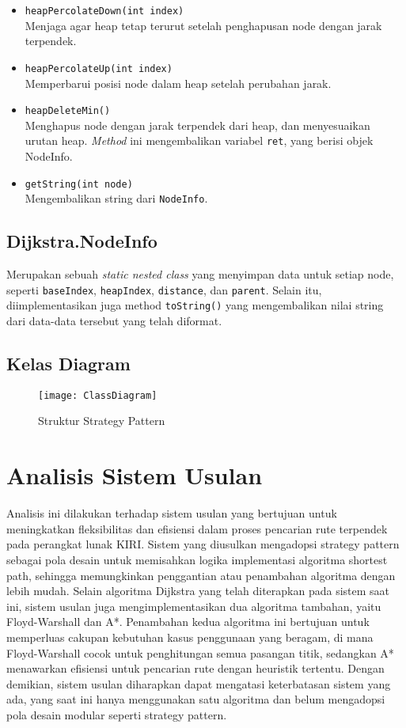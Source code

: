 \begin{itemize}
\begin{itemize}
        \item \texttt{heapPercolateDown(int index)}
        \\ Menjaga agar heap tetap terurut setelah penghapusan node dengan jarak terpendek.
        \item \texttt{heapPercolateUp(int index)}
        \\ Memperbarui posisi node dalam heap setelah perubahan jarak.
        \item \texttt{heapDeleteMin()}
        \\ Menghapus node dengan jarak terpendek dari heap, dan menyesuaikan urutan heap. \textit{Method} ini mengembalikan variabel \texttt{ret}, yang berisi objek NodeInfo.
        \item \texttt{getString(int node)}
        \\ Mengembalikan string dari \texttt{NodeInfo}.
    \end{itemize}
\end{itemize}

\subsection{Dijkstra.NodeInfo}
Merupakan sebuah \textit{static nested class} yang menyimpan data untuk setiap node, seperti \texttt{baseIndex}, \texttt{heapIndex}, \texttt{distance}, dan \texttt{parent}. Selain itu, diimplementasikan juga method \texttt{toString()} yang mengembalikan nilai string dari data-data tersebut yang telah diformat.

\subsection{Kelas Diagram}
\begin{figure}[h] 
    \centering  
    \texttt{[image: ClassDiagram]}  
    \caption{Struktur Strategy Pattern}
    \label{fig:struktursp2} 
\end{figure}
\newpage
\section{Analisis Sistem Usulan}
Analisis ini dilakukan terhadap sistem usulan yang bertujuan untuk meningkatkan fleksibilitas dan efisiensi dalam proses pencarian rute terpendek pada perangkat lunak KIRI. Sistem yang diusulkan mengadopsi strategy pattern sebagai pola desain untuk memisahkan logika implementasi algoritma shortest path, sehingga memungkinkan penggantian atau penambahan algoritma dengan lebih mudah. Selain algoritma Dijkstra yang telah diterapkan pada sistem saat ini, sistem usulan juga mengimplementasikan dua algoritma tambahan, yaitu Floyd-Warshall dan A*. Penambahan kedua algoritma ini bertujuan untuk memperluas cakupan kebutuhan kasus penggunaan yang beragam, di mana Floyd-Warshall cocok untuk penghitungan semua pasangan titik, sedangkan A* menawarkan efisiensi untuk pencarian rute dengan heuristik tertentu. Dengan demikian, sistem usulan diharapkan dapat mengatasi keterbatasan sistem yang ada, yang saat ini hanya menggunakan satu algoritma dan belum mengadopsi pola desain modular seperti strategy pattern.

